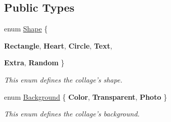 \subsection*{Public Types}
\begin{DoxyCompactItemize}
\item 
enum \hyperlink{class_collage_creator_aeb7a294ef28befb9567ccd6a6133bc1e}{Shape} \{ \par
{\bfseries Rectangle}, 
{\bfseries Heart}, 
{\bfseries Circle}, 
{\bfseries Text}, 
\par
{\bfseries Extra}, 
{\bfseries Random}
 \}
\begin{DoxyCompactList}\small\item\em This enum defines the collage's shape. \item\end{DoxyCompactList}\item 
enum \hyperlink{class_collage_creator_ad3349d041784e87b5d49625ad4107d39}{Background} \{ {\bfseries Color}, 
{\bfseries Transparent}, 
{\bfseries Photo}
 \}
\begin{DoxyCompactList}\small\item\em This enum defines the collage's background. \item\end{DoxyCompactList}\end{DoxyCompactItemize}
